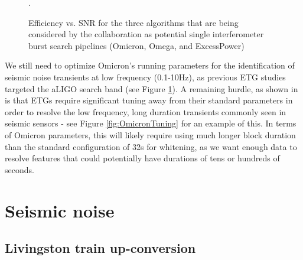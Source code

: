 \begin{figure}[htb]
	\caption{\label{fig:ETGs} Efficiency vs. SNR for the three algorithms that are being considered by the collaboration as potential single interferometer burst search pipelines (Omicron, Omega, and ExcessPower)}.
\end{figure}


We still need to optimize Omicron's running parameters for the identification of seismic noise transients at low frequency (0.1-10Hz), as previous ETG studies targeted the aLIGO search band (see Figure \ref{fig:ETGs}). 
A remaining hurdle, as shown in \cite{Macleod-Seisveto} is that ETGs require significant tuning away from their standard parameters in order to resolve the low frequency, long duration transients commonly seen in seismic sensors - see Figure \ref{fig:OmicronTuning} for an example of this. 
In terms of Omicron parameters, this will likely require using much longer block duration than the standard configuration of 32s for whitening, as we want enough data to resolve features that could potentially have durations of tens or hundreds of seconds. 


%
\section{Seismic noise}

\subsection{Livingston train up-conversion} 


